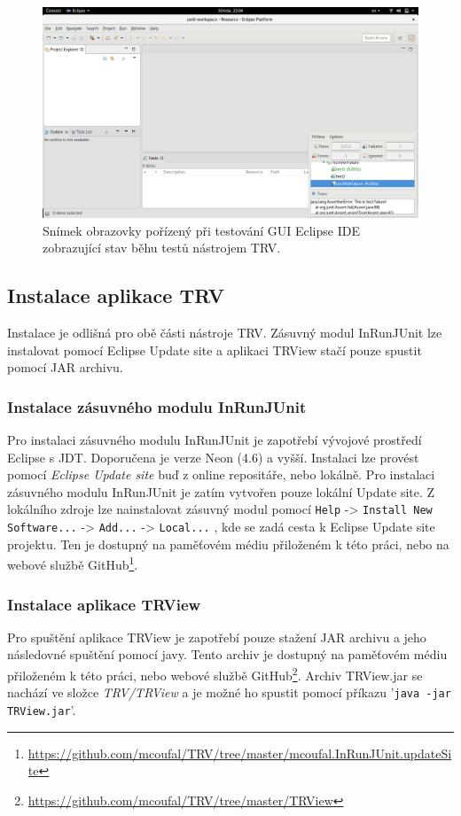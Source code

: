   \begin{figure}
    \includegraphics[width=\textwidth, center]{obrazky-figures/TRV_screenshot.png}
    \caption{Snímek obrazovky pořízený při testování GUI Eclipse IDE zobrazující stav běhu testů nástrojem TRV.}
    \label{fig:TRV_screenshot}
  \end{figure}

      \subsection{Instalace aplikace TRV}
      Instalace je odlišná pro obě části nástroje TRV. Zásuvný modul InRunJUnit lze instalovat pomocí Eclipse Update site a aplikaci TRView stačí pouze spustit pomocí JAR archivu.

      \subsubsection{Instalace zásuvného modulu InRunJUnit}
      Pro instalaci zásuvného modulu InRunJUnit je zapotřebí vývojové prostředí Eclipse s JDT. Doporučena je verze Neon (4.6) a vyšší. Instalaci lze provést pomocí \emph{Eclipse Update site} buď z online repositáře, nebo lokálně. Pro instalaci zásuvného modulu InRunJUnit je zatím vytvořen pouze lokální Update site. Z lokálního zdroje lze nainstalovat zásuvný modul pomocí \texttt{Help} -> \texttt{Install New Software...} -> \texttt{Add...} -> \texttt{Local...} , kde se zadá cesta k Eclipse Update site projektu. Ten je dostupný na paměťovém médiu přiloženém k této práci, nebo na webové službě GitHub\footnote{\url{https://github.com/mcoufal/TRV/tree/master/mcoufal.InRunJUnit.updateSite}}.

      \subsubsection{Instalace aplikace TRView}
      Pro spuštění aplikace TRView je zapotřebí pouze stažení JAR archivu a jeho následovné spuštění pomocí javy. Tento archiv je dostupný na paměťovém médiu přiloženém k této práci, nebo webové službě GitHub\footnote{\url{https://github.com/mcoufal/TRV/tree/master/TRView}}. Archiv TRView.jar se nachází ve složce \emph{TRV/TRView} a je možné ho spustit pomocí příkazu '\texttt{java -jar TRView.jar}'.

